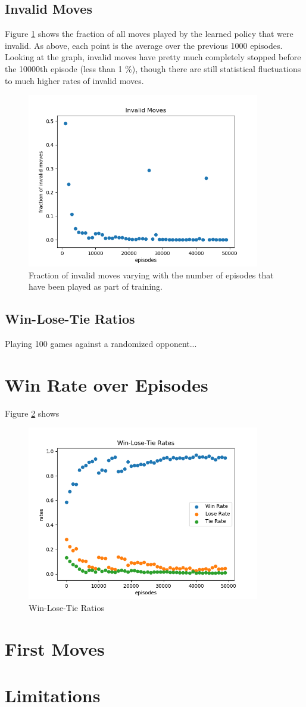 \documentclass{article}
\begin{document}
   \subsection{Invalid Moves}
   Figure \ref{fig:5c} shows the fraction of all moves played by the learned policy that were invalid. As above, each
   point is the average over the previous 1000 episodes. Looking at the graph, invalid moves have pretty much
   completely stopped before the 10000th episode (less than 1 \%), though there are still statistical fluctuations
   to much higher rates of invalid moves.
      \begin{figure}[h] \centering
          \includegraphics[width=4in]{resources/part5c}
          \caption{ Fraction of invalid moves varying with the number of episodes that have been played as
                  part of training. }
          \label{fig:5c}
       \end{figure}

   \subsection{Win-Lose-Tie Ratios}
   Playing 100 games against a randomized opponent...


   \section{Win Rate over Episodes}
   Figure \ref{fig:6} shows
      \begin{figure}[h] \centering
          \includegraphics[width=4in]{resources/part6}
          \caption{ Win-Lose-Tie Ratios }
          \label{fig:6}
       \end{figure}


   \section{First Moves}
   \section{Limitations}
\end{document}

